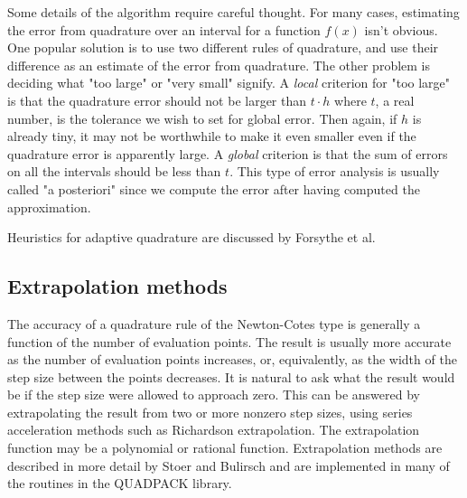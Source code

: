 \documentclass[a4paper]{article}
\begin{document}
\begin{algorithm}[H]

  \DontPrintSemicolon


\end{algorithm}

Some details of the algorithm require careful thought. For many cases, estimating the error from quadrature over an interval for a function $f(x)$ isn't obvious. One popular solution is to use two different rules of quadrature, and use their difference as an estimate of the error from quadrature. The other problem is deciding what "too large" or "very small" signify. A \textit{local} criterion for "too large" is that the quadrature error should not be larger than $t \cdot h$ where $t$, a real number, is the tolerance we wish to set for global error. Then again, if $h$ is already tiny, it may not be worthwhile to make it even smaller even if the quadrature error is apparently large. A \textit{global} criterion is that the sum of errors on all the intervals should be less than $t$. This type of error analysis is usually called "a posteriori" since we compute the error after having computed the approximation.

Heuristics for adaptive quadrature are discussed by Forsythe et al.

\subsection{Extrapolation methods}
The accuracy of a quadrature rule of the Newton-Cotes type is generally a function of the number of evaluation points. The result is usually more accurate as the number of evaluation points increases, or, equivalently, as the width of the step size between the points decreases. It is natural to ask what the result would be if the step size were allowed to approach zero. This can be answered by extrapolating the result from two or more nonzero step sizes, using series acceleration methods such as Richardson extrapolation. The extrapolation function may be a polynomial or rational function. Extrapolation methods are described in more detail by Stoer and Bulirsch and are implemented in many of the routines in the QUADPACK library.
\end{document}
